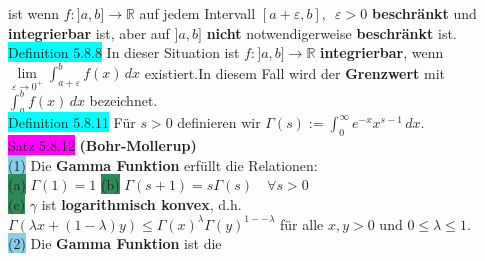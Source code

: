 \documentclass[landscape, 10pt]{article}
\newcommand{\R}{\mathbb{R}}
\begin{document}
\begin{multicols}{3}
                     ist wenn \textcolor{NavyBlue}{$f:]a,b]\longrightarrow\R$} 
                     auf jedem Intervall 
                     \textcolor{NavyBlue}{$[a+\varepsilon,b],\enspace\varepsilon>0$} 
                     \textbf{beschränkt} und \textbf{integrierbar} ist, aber auf 
                     \textcolor{NavyBlue}{$]a,b]$} \textbf{nicht} notwendigerweise 
                     \textbf{beschränkt} ist. \\
              \colorbox{cyan}{Definition 5.8.8} In dieser Situation ist 
                     \textcolor{NavyBlue}{$f:]a,b]\longrightarrow\R$} 
                     \textbf{integrierbar}, wenn \textcolor{NavyBlue}{
                     $\lim\limits_{\varepsilon\to0^+}\int_{a+\varepsilon}^bf(x)\,dx$} 
                     existiert.In diesem Fall wird der \textbf{Grenzwert} mit 
                     \textcolor{NavyBlue}{$\int_a^bf(x)\,dx$} bezeichnet. \\
              \colorbox{cyan}{Definition 5.8.11} 
                     Für \textcolor{NavyBlue}{$s>0$} definieren wir 
                     \textcolor{NavyBlue}{
                     $\Gamma(s):=\int_0^\infty e^{-x}x^{s-1}\,dx$}. \\
              \colorbox{magenta}{Satz 5.8.12} 
              \textbf{(Bohr-Mollerup)} \\
                     \colorbox{SkyBlue}{(1)} 
                            Die \textbf{Gamma Funktion} erfüllt die Relationen:\\ 
                            \colorbox{SeaGreen}{(a)}
                                   \textcolor{NavyBlue}{$\Gamma(1)=1$} \qquad
                            \colorbox{SeaGreen}{(b)} 
                                   \textcolor{NavyBlue}{
                                   $\Gamma(s+1)=s\Gamma(s)\quad\forall s>0$} \\
                            \colorbox{SeaGreen}{(c)} 
                                   \textcolor{NavyBlue}{$\gamma$} ist 
                                   \textbf{logarithmisch konvex}, d.h. 
                                   \textcolor{NavyBlue}{
                                   $\Gamma(\lambda x+(1-\lambda)y)
                                   \leqslant\Gamma(x)^\lambda\Gamma(y)^{1--\lambda}$}
                                   für alle \textcolor{NavyBlue}{$x,y>0$} und 
                                   \textcolor{NavyBlue}{
                                   $0\leqslant\lambda\leqslant1$}.\\
                     \colorbox{SkyBlue}{(2)} Die \textbf{Gamma Funktion} ist die 

\end{multicols}
\end{document}
